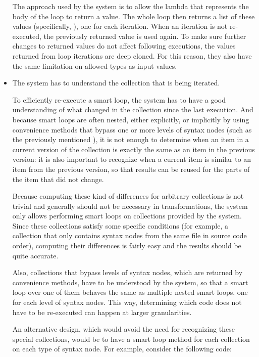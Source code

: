 \begin{itemize}
The approach used by the system is to allow the lambda that represents the body of the loop to return a value. The whole loop then returns a list of these values (specifically, ), one for each iteration. When an iteration is not re-executed, the previously returned value is used again. To make sure further changes to returned values do not affect following executions, the values returned from loop iterations are deep cloned. For this reason, they also have the same limitation on allowed types as input values.

\item \label{smart-loop-collection} The system has to understand the collection that is being iterated.

To efficiently re-execute a smart loop, the system has to have a good understanding of what changed in the collection since the last execution. And because smart loops are often nested, either explicitly, or implicitly by using convenience methods that bypass one or more levels of syntax nodes (such as the previously mentioned ), it is not enough to determine when an item in a current version of the collection is exactly the same as an item in the previous version: it is also important to recognize when a current item is similar to an item from the previous version, so that results can be reused for the parts of the item that did not change.

Because computing these kind of differences for arbitrary collections is not trivial and generally should not be necessary in transformations, the system only allows performing smart loops on collections provided by the system. Since these collections satisfy some specific conditions (for example, a collection that only contains syntax nodes from the same file in source code order), computing their differences is fairly easy and the results should be quite accurate.

Also, collections that bypass levels of syntax nodes, which are returned by convenience methods, have to be understood by the system, so that a smart loop over one of them behaves the same as multiple nested smart loops, one for each level of syntax nodes. This way, determining which code does not have to be re-executed can happen at larger granularities.

An alternative design, which would avoid the need for recognizing these special collections, would be to have a smart loop method for each collection on each type of syntax node. For example, consider the following code:


\end{itemize}
